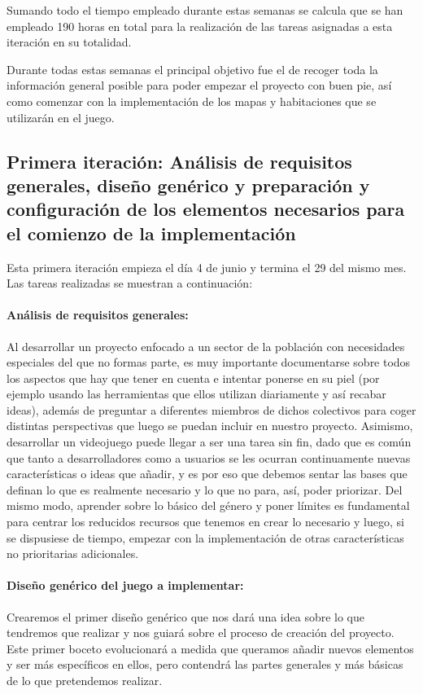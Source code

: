 Sumando todo el tiempo empleado durante estas semanas se calcula que se han empleado 190 horas en total para la realización de las tareas asignadas a esta iteración en su totalidad.

Durante todas estas semanas el principal objetivo fue el de recoger toda la información general posible para poder empezar el proyecto con buen pie, así como comenzar con la implementación de los mapas y habitaciones que se utilizarán en el juego.

\subsection{Primera iteración: Análisis de requisitos generales, diseño genérico y preparación y configuración de los elementos necesarios para el comienzo de la implementación}

Esta primera iteración empieza el día 4 de junio y termina el 29 del mismo mes. Las tareas realizadas se muestran a continuación:

\paragraph{Análisis de requisitos generales:} Al desarrollar un proyecto enfocado a un sector de la población con necesidades especiales del que no formas parte, es muy importante documentarse sobre todos los aspectos que hay que tener en cuenta e intentar ponerse en su piel (por ejemplo usando las herramientas que ellos utilizan diariamente y así recabar ideas), además de preguntar a diferentes miembros de dichos colectivos para coger distintas perspectivas que luego se puedan incluir en nuestro proyecto.
Asimismo, desarrollar un videojuego puede llegar a ser una tarea sin fin, dado que es común que tanto a desarrolladores como a usuarios se les ocurran continuamente nuevas características o ideas que añadir, y es por eso que debemos sentar las bases que definan lo que es realmente necesario y lo que no para, así, poder priorizar. 
Del mismo modo, aprender sobre lo básico del género y poner límites es fundamental para centrar los reducidos recursos que tenemos en crear lo necesario y luego, si se dispusiese de tiempo, empezar con la implementación de otras características no prioritarias adicionales.

\paragraph{Diseño genérico del juego a implementar:} Crearemos el primer diseño genérico que nos dará una idea sobre lo que tendremos que realizar y nos guiará sobre el proceso de creación del proyecto. Este primer boceto evolucionará a medida que queramos añadir nuevos elementos y ser más específicos en ellos, pero contendrá las partes generales y más básicas de lo que pretendemos realizar.


